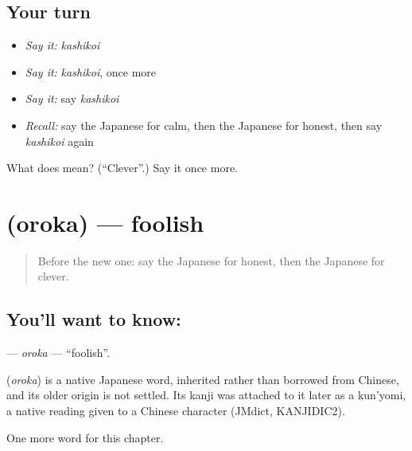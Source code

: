\subsection*{Your turn}
\begin{itemize}
\raggedright
  \item \emph{Say it:} \emph{kashikoi}
  \item \emph{Say it:} \emph{kashikoi}, once more
  \item \emph{Say it:} say \emph{kashikoi}
  \item \emph{Recall:} say the Japanese for calm, then the Japanese for honest, then say \emph{kashikoi} again
\end{itemize}

\begin{tcolorbox}[breakable,colback=teal!4,colframe=teal!35!black,title={Before you move on}]
What does  mean? (\textquotedblleft{}Clever\textquotedblright{}.) Say it once more.
\end{tcolorbox}
\section[\texorpdfstring{\ja{おろか} (oroka)}{おろか (oroka)}]{ (oroka) — foolish}

\label{lesson:JA-C128-oroka}



\begin{quote}
Before the new one: say the Japanese for honest, then the Japanese for clever.
\end{quote}

\subsection*{You'll want to know: }
\textbf{} — \emph{oroka} — \textquotedblleft{}foolish\textquotedblright{}.

\begin{cousinweb}
\textbf{} (\emph{oroka}) is a native Japanese word, inherited rather than borrowed from Chinese, and its older origin is not settled. Its kanji was attached to it later as a kun'yomi, a native reading given to a Chinese character (JMdict, KANJIDIC2).
\end{cousinweb}

\begin{grammarlens}[title={What you've built}]
One more word for this chapter.
\end{grammarlens}

